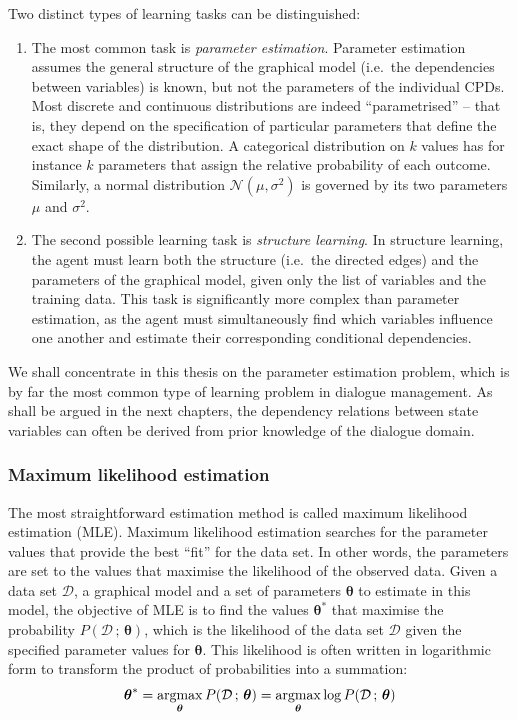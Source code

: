 Two distinct types of learning tasks can be distinguished:
\begin{enumerate}
\item The most common task is \textit{parameter estimation}.  Parameter estimation assumes the general structure of the graphical model (i.e.\ the dependencies between variables) is known, but not the parameters of the individual CPDs. Most discrete and continuous distributions are indeed ``parametrised'' -- that is, they depend on the specification of particular parameters that define the exact shape of the distribution. A categorical distribution on $k$ values has for instance $k$ parameters that assign the relative probability of each outcome.  Similarly, a normal distribution $\mathcal{N}(\mu,\sigma^2)$ is governed by its two parameters $\mu$ and $\sigma^2$. 

\item The second possible learning task is \textit{structure learning}.  In structure learning, the agent must learn both the structure (i.e.\ the directed edges) and the parameters of the graphical model, given only the list of variables and the training data.  This task is significantly more complex than parameter estimation, as the agent must simultaneously find which variables influence one another and estimate their corresponding conditional dependencies. 
\end{enumerate}

We shall concentrate in this thesis on the parameter estimation problem, which is by far the most common type of learning problem in dialogue management. As shall be argued in the next chapters, the dependency relations between state variables can often be derived from prior knowledge of the dialogue domain.

\subsubsection*{Maximum likelihood estimation}
The most straightforward estimation method is called maximum likelihood estimation (MLE). Maximum likelihood estimation searches for the parameter values that provide the best ``fit'' for the data set.  In other words, the parameters are set to the values that maximise the likelihood of the observed data.  Given a data set $\mathcal{D}$, a graphical model and a set of parameters $\boldsymbol\theta$ to estimate in this model, the objective of MLE is to find the values $\boldsymbol\theta^*$  that maximise the probability $P(\mathcal{D} \, ;  \, \boldsymbol\theta)$, which is the likelihood of the data set $\mathcal{D}$ given the specified parameter values for $\boldsymbol\theta$. This likelihood is often written in logarithmic form to transform the product of probabilities into a summation: 
\begin{equation}
\boldsymbol\theta^* = \argmax_{\boldsymbol\theta} P(\mathcal{D}  \, ; \, \boldsymbol\theta) = \argmax_{\boldsymbol\theta} \log P(\mathcal{D}  \,  ;  \, \boldsymbol\theta)
\end{equation}

